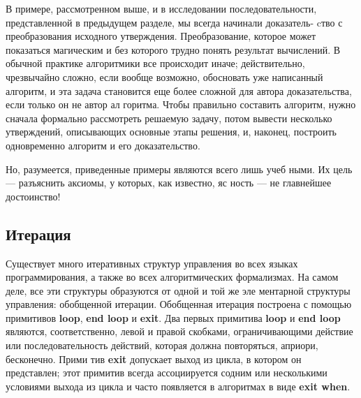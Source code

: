 В примере, рассмотренном выше, и в исследовании последовательно­сти,
 представленной в предыдущем  разделе,  мы  всегда начинали  
 дока­затель-
 cтво с преобразования исходного утверждения. Преобразование, 
которое может показаться  магическим  и  без  которого трудно  понять 
результат вычислений. В обычной практике алгоритмики все происхо­дит
 иначе;  действительно,  чрезвычайно  сложно,  если  вообще  возмож­но,
  обосновать уже написанный алгоритм, и эта задача становится еще 
более сложной для  автора доказательства, если только он не автор ал­
горитма.  Чтобы  правильно составить  алгоритм,  нужно  сначала 
фор­мально рассмотреть решаемую задачу, потом вывести несколько утвер­ждений,
 описывающих основные этапы решения, и, наконец, построить 
одновременно алгоритм и его доказательство.
\pagebreak

Но,  разумеется,  приведенные  примеры  являются  всего  лишь  учеб­
ными.  Их  цель  —  разъяснить  аксиомы,  у  которых,  как  известно,  яс­
ность — не  главнейшее  достоинство!
\subsection{Итерация}
\noindent Существует много итеративных структур управления во всех языках 
программирования, а также во всех алгоритмических формализмах. 
На самом деле, все эти структуры образуются от одной и той же эле­
ментарной структуры управления: обобщенной итерации. Обобщенная 
итерация построена с помощью примитивов \textbf{loop},  \textbf{end loop} и \textbf{exit}. Два 
первых примитива \textbf{loop} и \textbf{end loop}  являются, соответственно, левой и 
правой скобками, ограничивающими действие или последовательность 
действий, которая должна повторяться, априори, бесконечно. Прими­
тив \textbf{exit} допускает выход из цикла, в котором он представлен; этот 
примитив  всегда  ассоциируется содним  или  несколькими  условиями 
выхода из цикла и часто появляется в алгоритмах в виде \textbf{exit when}.

